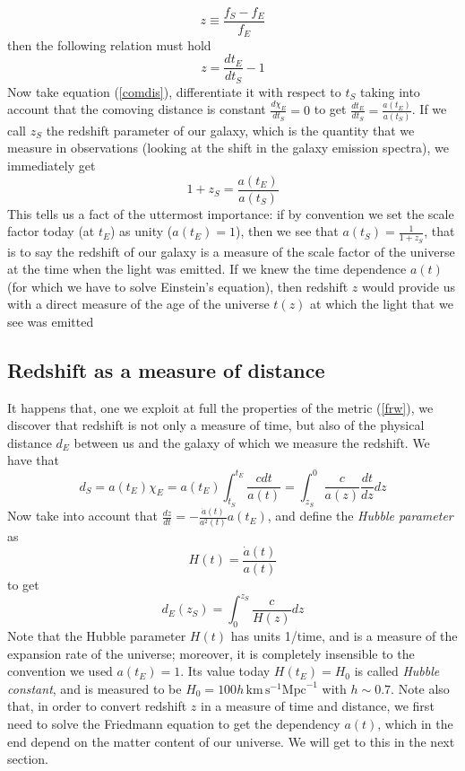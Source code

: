 \documentclass[11pt, a4paper,oneside,openright]{book}
\numberwithin{equation}{section}
\begin{document}
\begin{equation}
z\equiv \frac{f_S-f_E}{f_E}
\end{equation}
then the following relation must hold
\begin{equation}
z=\frac{dt_E}{dt_S}-1
\end{equation}
Now take equation (\ref{comdis}), differentiate it with respect to $t_S$ taking into account that the comoving distance is constant $\frac{d\chi_E}{dt_S}=0$ to get $\frac{dt_E}{dt_S}=\frac{a(t_E)}{a(t_S)}$. If we call $z_S$ the redshift parameter of our galaxy, which is the quantity that we measure in observations (looking at the shift in the galaxy emission spectra), we immediately get
\begin{equation}
1+z_S=\frac{a(t_E)}{a(t_S)}
\end{equation}
This tells us a fact of the uttermost importance: if by convention we set the scale factor today (at $t_E$) as unity ($a(t_E)=1$), then we see that $a(t_S)=\frac{1}{1+z_S}$, that is to say the redshift of our galaxy is a measure of the scale factor of the universe at the time when the light was emitted. If we knew the time dependence $a(t)$ (for which we have to solve Einstein's equation), then redshift $z$ would provide us with a direct measure of the age of the universe $t(z)$ at which the light that we see was emitted
\subsection{Redshift as a measure of distance}
It happens that, one we exploit at full the properties of the metric (\ref{frw}), we discover that redshift is not only a measure of time, but also of the physical distance $d_E$ between us and the galaxy of which we measure the redshift. We have that
\begin{equation}
d_S=a(t_E)\chi_E=a(t_E)\int_{t_S}^{t_E}\frac{cdt}{a(t)}=\int_{z_S}^0\frac{c}{a(z)}\frac{dt}{dz}dz
\end{equation}
Now take into account that $\frac{dz}{dt}=-\frac{\dot{a}(t)}{a^2(t)}a(t_E)$, and define the \textit{Hubble parameter} as 
\begin{equation}
H(t)=\frac{\dot{a}(t)}{a(t)}
\end{equation}
to get
\begin{equation}
\label{distanceredshift}
d_E(z_S)=\int_0^{z_S}\frac{c}{H(z)}dz
\end{equation}
Note that the Hubble parameter $H(t)$ has units 1/time, and is a measure of the expansion rate of the universe; moreover, it is completely insensible to the convention we used $a(t_E)=1$. Its value today $H(t_E)=H_0$ is called \textit{Hubble constant}, and is measured to be $H_0=100h\,\mathrm{km}\,\mathrm{s}^{-1}\mathrm{Mpc}^{-1}$ with $h\sim 0.7$. Note also that, in order to convert redshift $z$ in a measure of time and distance, we first need to solve the Friedmann equation to get the dependency $a(t)$, which in the end depend on the matter content of our universe. We will get to this in the next section. 
\end{document}
